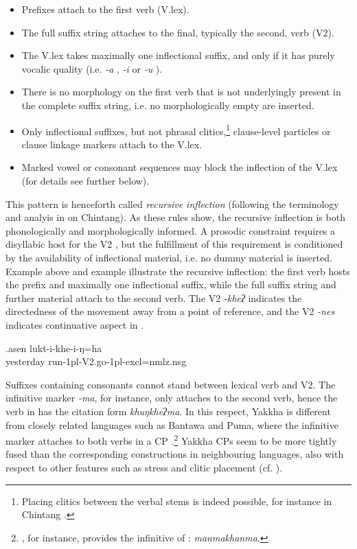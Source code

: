 \begin{itemize}
\item Prefixes attach to the first verb (V.lex).
\item The full suffix string attaches to the final, typically the second, verb (V2).
\item The V.lex takes maximally one inflectional suffix, and only if it has purely vocalic quality (i.e. \emph{-a} , \emph{-i}  or \emph{-u} ).
\item There is no morphology on the first verb that is not underlyingly present in the complete suffix string, i.e. no morphologically empty  are inserted.
\item Only inflectional suffixes, but not phrasal clitics,\footnote{Placing clitics between the verbal stems is indeed possible, for instance in Chintang \citep{Bickeletal2007Free}.} clause-level particles or clause linkage markers attach to the V.lex. 
\item Marked vowel or consonant sequences may block the inflection of the V.lex (for details see further below).
\end{itemize}

This pattern is henceforth called \emph{recursive inflection} (following the terminology and analyis in  \citealt{Bickeletal2007Free} on Chintang). As these rules show, the recursive inflection is both phonologically and morphologically informed. A prosodic constraint  requires a disyllabic host for the V2 , but the fulfillment of this requirement is conditioned by the availability of inflectional material, i.e. no dummy material is inserted. Example \Last above and example  \Next illustrate the recursive inflection: the first verb hosts the prefix and maximally one inflectional suffix, while the full suffix string and further material attach to the second verb. The  V2 \emph{-kheʔ}  indicates the directedness of the movement away from a point of reference, and the V2 \emph{-nes}  indicates continuative aspect in \Last. 

\exg.asen lukt-i-khe-i-ŋ=ha\\
	yesterday run{\sc -1pl-V2.go-1pl-excl=nmlz.nsg}\\
 
Suffixes containing consonants cannot stand between lexical verb and V2. The infinitive marker \emph{-ma}, for instance, only attaches to the second verb, hence the verb in \Last[b] has the citation form \emph{khuŋkheʔma}. In this respect, Yakkha is different from closely related languages  such as Bantawa and Puma, where the infinitive marker attaches to both verbs in a CP \citep{Doornenbal2009A-grammar, Bickeletal2006The-Chintang}.\footnote{\citet[255]{Doornenbal2009A-grammar}, for instance, provides  the infinitive of : \emph{manmakhanma}.} Yakkha CPs seem to be more tightly fused than the corresponding constructions in neighbouring languages, also with respect to other features such as stress and clitic placement (cf. ). 

